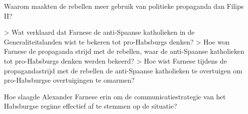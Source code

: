 \documentclass[11pt]{amsart}
\begin{document}






Waarom maakten de rebellen meer gebruik van politieke propaganda dan Filips II?

> Wat verklaard dat Farnese de anti-Spaanse katholieken in de Generaliteitslanden wist te bekeren tot pro-Habsburgs denken?
> Hoe won Farnese de propaganda strijd met de rebellen, waar de anti-Spaanse katholieken tot pro-Habsburgs denken werden bekeerd?
> Hoe wist Farnese tijdens de propagandastrijd met de rebellen de anti-Spaanse katholieken te overtuigen om pro-Habsburgse overtuigingen te omarmen?

Hoe slaagde Alexander Farnese erin om de communicatiestrategie van het Habsburgse regime effectief af te stemmen op de situatie? 
\end{document}
